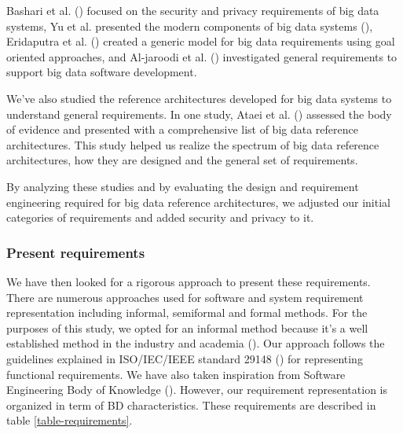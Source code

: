 \documentclass[conference]{IEEEtran}
\begin{document}
Bashari et al. (\cite{bashari2016security}) focused on the security and privacy requirements of big data systems, Yu et al. presented the modern components of big data systems (\cite{yu2019components}), Eridaputra et al. (\cite{eridaputra2014modeling}) created a generic model for big data requirements using goal oriented approaches, and Al-jaroodi et al. (\cite{al2016characteristics}) investigated general requirements to support big data software development. 

We've also studied the reference architectures developed for big data systems to understand general requirements. In one study, Ataei et al. (\cite{ataei2020big}) assessed the body of evidence and presented with a comprehensive list of big data reference architectures. This study helped us realize the spectrum of big data reference architectures, how they are designed and the general set of requirements.  

By analyzing these studies and by evaluating the design and requirement engineering required for big data reference architectures, we adjusted our initial categories of requirements and added security and privacy to it. 

\subsubsection{Present requirements}
We have then looked for a rigorous approach to present these requirements. There are numerous approaches used for software and system requirement representation including informal, semiformal and formal methods. For the purposes of this study, we opted for an informal method because it's a well established method in the industry and academia (\cite{kassab2014state}). Our approach follows the guidelines explained in ISO/IEC/IEEE standard 29148 (\cite{ISO29148}) for representing functional requirements. We have also taken inspiration from Software Engineering Body of Knowledge (\cite{abran2004software}). However, our requirement representation is organized in term of BD characteristics. These requirements are described in table \ref{table-requirements}.
\end{document}
